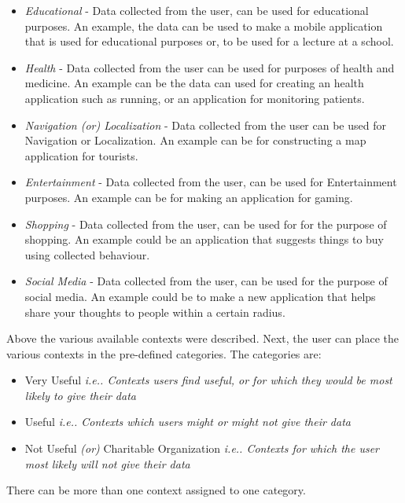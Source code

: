 \begin{itemize}
\item {\it Educational} - Data collected from the user, can be used for educational purposes. An example, the data can be used to make a mobile application that is used for educational purposes or, to be used for a lecture at a school.
\item {\it Health} - Data collected from the user can be used for purposes of health and medicine. An example can be the data
can used for creating an health application such as running, or an application for monitoring patients.
\item {\it Navigation (or) Localization} - Data collected from the user can be used for Navigation or Localization. An example can be
for constructing a map application for tourists.
\item {\it Entertainment} - Data collected from the user, can be used for Entertainment purposes. An example can be for making an application
for gaming.
\item {\it Shopping} - Data collected from the user, can be used for for the purpose of shopping. An example could be an application that
suggests things to buy using collected behaviour.
\item {\it Social Media} - Data collected from the user, can be used for the purpose of social media. An example could be to make a new application that helps share your thoughts to people within a certain radius.

\end{itemize}


Above the various available contexts were described. Next, the user can place the various contexts in the pre-defined categories. The categories
are:

\begin{itemize}
\item Very Useful {\it i.e.. Contexts users find useful, or for which they would be most likely to give their data}
\item Useful {\it i.e.. Contexts which users might or might not give their data}
\item Not Useful {\it (or)} Charitable Organization {\it i.e.. Contexts for which the user most likely will not give their data}

\end{itemize}

There can be more than one context assigned to one category.

